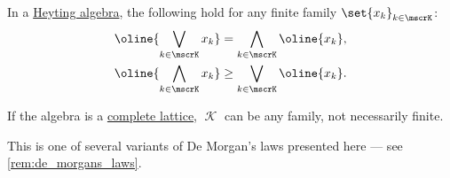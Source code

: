 \begin{theorem}\label{thm:de_morgans_laws_for_heyting_algebras}
  In a \hyperref[def:heyting_algebra]{Heyting algebra}, the following hold for any finite family \( \set{ x_k }_{k \in \mscrK} \):
  \begin{align}
    \oline{\bigvee_{k \in \mscrK} x_k}   &=    \bigwedge_{k \in \mscrK} \oline{x_k}, \label{eq:thm:de_morgans_laws_for_heyting_algebras/complement_of_join} \\
    \oline{\bigwedge_{k \in \mscrK} x_k} &\geq \bigvee_{k \in \mscrK} \oline{x_k}.   \label{eq:thm:de_morgans_laws_for_heyting_algebras/complement_of_meet}
  \end{align}

  If the algebra is a \hyperref[def:complete_lattice]{complete lattice}, \( \mscrK \) can be any family, not necessarily finite.
\end{theorem}
\begin{comments}
  \item This is one of several variants of De Morgan's laws presented here --- see \cref{rem:de_morgans_laws}.
\end{comments}
